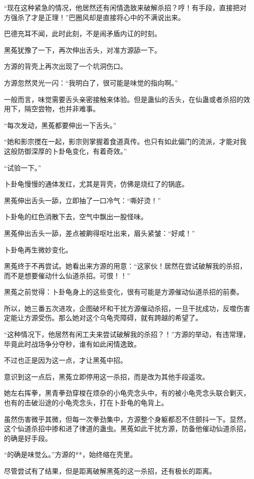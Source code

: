 \begin{this_body}
“现在这种紧急的情况，他居然还有闲情逸致来破解杀招？哼！有手段，直接把对方强杀了才是正理！”巴圈风却是直接将心中的不满说出来。

巴德充耳不闻，此时此刻，不是闹矛盾内讧的时刻。

黑菟犹豫了一下，再次伸出舌头，对准方源舔一下。

方源的背壳上再次出现了一个坑洞伤口。

方源忽然灵光一闪：“我明白了，很可能是味觉的指向啊。”

一般而言，味觉需要舌头亲密接触来体验。但是蛊仙的舌头，在仙蛊或者杀招的效用下，隔空尝物，也并非难事。

“每次发动，黑菟都要伸出一下舌头。”

“她和影宗搅在一起，影宗则掌握着食道真传。也只有如此偏门的流派，才能对我这般防御深厚的卜卦龟变化，有着奇效。”

“试验一下。”

卜卦龟慢慢的通体发红，尤其是背壳，仿佛是烧红了的锅底。

黑菟伸出舌头一舔，立即抽了一口冷气：“嘶好烫！”

卜卦龟的红色消散下去，空气中飘出一股怪味。

黑菟伸出舌头一舔，差点被齁得呕吐出来，眉头紧皱：“好咸！”

卜卦龟再生微妙变化。

黑菟终于不再尝试。她看出来方源的用意：“这家伙！居然在尝试破解我的杀招，而不是想要催动什么仙道杀招。可恨！！”

黑菟之前觉得：卜卦龟身上的这些变化，很有可能是方源催动仙道杀招的前奏。

所以，她三番五次进攻，企图破坏和干扰方源催动杀招，一旦干扰成功，反噬伤害定能让方源受伤。那么她对这个乌龟壳障碍，就有跨越的希望了。

“这种情况下，他居然有闲工夫来尝试破解我的杀招？！”方源的举动，有违常理，毕竟此时战场争分夺秒，谁有如此闲情逸致。

不过也正是因为这一点，才让黑菟中招。

意识到这一点后，黑菟立即停用这一杀招，而是改为其他手段遥攻。

她左右挥拳，黑青拳劲穿梭在烦杂的小龟壳念头中，有的被小龟壳念头联合剿灭，也有的击破沿途的小龟壳念头，打在卜卦龟的龟背上。

虽然伤害微乎其微，但每一次拳劲集中，方源整个身躯都忍不住颤抖一下。显然，这个仙道杀招中掺和进了律道的蛊虫。黑菟如此干扰方源，防备他催动仙道杀招，的确是好手段。

“的确是味觉么。”方源的**，始终缩在壳里。

尽管尝试有了结果，但是距离破解黑菟的这一杀招，还有极长的距离。


\end{this_body}
